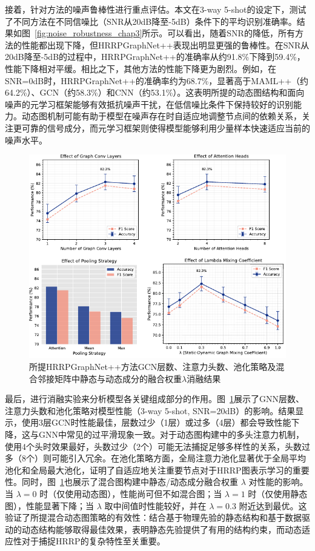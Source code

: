接着，针对方法的噪声鲁棒性进行重点评估。本文在3-way 5-shot的设定下，测试了不同方法在不同信噪比（SNR从20dB降至-5dB）条件下的平均识别准确率。结果如图~\ref{fig:noise_robustness_chap3}所示。可以看出，随着SNR的降低，所有方法的性能都出现下降，但HRRPGraphNet++表现出明显更强的鲁棒性。在SNR从20dB降至-5dB的过程中，HRRPGraphNet++的准确率从约91.8\%下降到59.4\%，性能下降相对平缓。相比之下，其他方法的性能下降更为剧烈。例如，在SNR=0dB时，HRRPGraphNet++的准确率约为68.7\%，显著高于MAML++（约64.2\%）、GCN（约58.3\%）和CNN（约53.1\%）。这表明所提的动态图结构和面向噪声的元学习框架能够有效抵抗噪声干扰，在低信噪比条件下保持较好的识别能力。动态图机制可能有助于模型在噪声存在时自适应地调整节点间的依赖关系，关注更可靠的信号成分，而元学习框架则使得模型能够利用少量样本快速适应当前的噪声水平。

\begin{figure}[h]
    \centering
    \includegraphics[width=0.8\linewidth]{figures/abla.pdf} %
    \caption{所提HRRPGraphNet++方法GCN层数、注意力头数、池化策略及混合邻接矩阵中静态与动态成分的融合权重$\lambda$消融结果}
    \label{fig:abla}
\end{figure}

最后，进行消融实验来分析模型各关键组成部分的作用。图~\ref{fig:abla}展示了GNN层数、注意力头数和池化策略对模型性能（3-way 5-shot, SNR=20dB）的影响。结果显示，使用3层GCN时性能最佳，层数过少（1层）或过多（4层）都会导致性能下降，这与GNN中常见的过平滑现象一致。对于动态图构建中的多头注意力机制，使用4个头时效果最好，头数过少（2个）可能无法捕捉足够多样性的关系，头数过多（8个）则可能引入冗余。在池化策略方面，全局注意力池化显著优于全局平均池化和全局最大池化，证明了自适应地关注重要节点对于HRRP图表示学习的重要性。同时，图~\ref{fig:abla}也展示了混合图构建中静态/动态成分融合权重 $\lambda$ 对性能的影响。当 $\lambda=0$ 时（仅使用动态图），性能尚可但不如混合图；当 $\lambda=1$ 时（仅使用静态图），性能显著下降；当 $\lambda$ 取中间值时性能较好，并在 $\lambda=0.3$ 附近达到最优。这验证了所提混合动态图策略的有效性：结合基于物理先验的静态结构和基于数据驱动的动态结构能够取得最佳效果，表明静态先验提供了有用的结构约束，而动态适应性对于捕捉HRRP的复杂特性至关重要。

